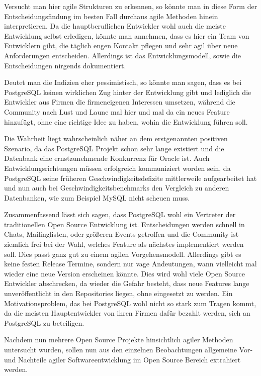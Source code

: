 Versucht man hier agile Strukturen zu erkennen, so könnte man in diese Form der Entscheidungsfindung im besten Fall durchaus agile Methoden hinein interpretieren. Da die hauptberuflichen Entwickler wohl auch die meiste Entwicklung selbst erledigen, könnte man annehmen, dass es hier ein Team von Entwicklern gibt, die täglich engen Kontakt pflegen und sehr agil über neue Anforderungen entscheiden. Allerdings ist das Entwicklungsmodell, sowie die Entscheidungen nirgends dokumentiert.

Deutet man die Indizien eher pessimistisch, so könnte man sagen, dass es bei PostgreSQL keinen wirklichen Zug hinter der Entwicklung gibt und lediglich die Entwickler aus Firmen die firmeneigenen Interessen umsetzen, während die Community nach Lust und Laune mal hier und mal da ein neues Feature hinzufügt, ohne eine richtige Idee zu haben, wohin die Entwicklung führen soll.

Die Wahrheit liegt wahrscheinlich näher an dem erstgenannten positiven Szenario, da das PostgreSQL Projekt schon sehr lange existiert und die Datenbank eine ernstzunehmende Konkurrenz für Oracle ist. Auch Entwicklungsrichtungen müssen erfolgreich kommuniziert worden sein, da PostgreSQL seine früheren Geschwindigkeitsdefizite mittlerweile aufgearbeitet hat und nun auch bei Geschwindigkeitsbenchmarks den Vergleich zu anderen Datenbanken, wie zum Beispiel MySQL nicht scheuen muss.

Zusammenfassend lässt sich sagen, dass PostgreSQL wohl ein Vertreter der traditionellen Open Source Entwicklung ist. Entscheidungen werden schnell in Chats, Mailinglisten, oder größeren Events getroffen und die Community ist ziemlich frei bei der Wahl, welches Feature als nächstes implementiert werden soll. Dies passt ganz gut zu einem agilen Vorgehensmodell. Allerdings gibt es keine festen Release Termine, sondern nur vage Andeutungen, wann vielleicht mal wieder eine neue Version erscheinen könnte. Dies wird wohl viele Open Source Entwickler abschrecken, da wieder die Gefahr besteht, dass neue Features lange unveröffentlicht in den Repositories liegen, ohne eingesetzt zu werden. Ein Motivationsproblem, das bei PostgreSQL wohl nicht so stark zum Tragen kommt, da die meisten Hauptentwickler von ihren Firmen dafür bezahlt werden, sich an PostgreSQL zu beteiligen.

Nachdem nun mehrere Open Source Projekte hinsichtlich agiler Methoden untersucht wurden, sollen nun aus den einzelnen Beobachtungen allgemeine Vor- und Nachteile agiler Softwareentwicklung im Open Source Bereich extrahiert werden.
